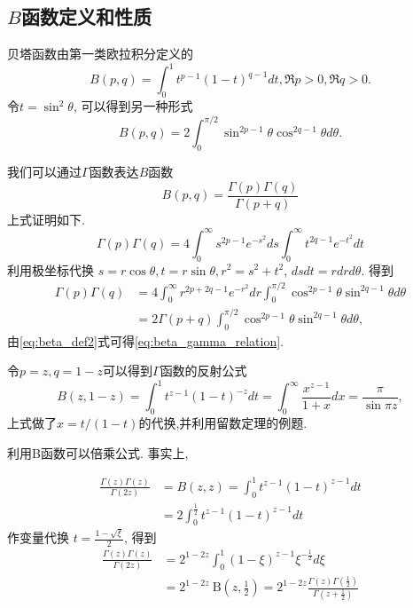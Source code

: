 \subsection{$B$函数定义和性质}
贝塔函数由第一类欧拉积分定义的
\begin{equation}
    B(p, q) = \int_0^1 t^{p -1} (1-t)^{q-1} dt, \Re p> 0, \Re q >0.
    \label{eq:beta_def1}
\end{equation}
令$t=\sin^2{\theta}$, 可以得到另一种形式
\begin{equation}
    B(p, q)  = 2\int_{0}^{\pi/2} \sin ^{2p -1}{\theta} \cos^{2q -1}{\theta} d\theta.
    \label{eq:beta_def2}
\end{equation}

我们可以通过$\Gamma$函数表达$B$函数
\begin{equation}
B(p, q)=\frac{\Gamma(p) \Gamma(q)}{\Gamma(p+q)}
\label{eq:beta_gamma_relation}
\end{equation}
上式证明如下.
$$
\Gamma(p) \Gamma(q)=4 \int_{0}^{\infty} s^{2 p-1} e^{-s^{2}} d s \int_{0}^{\infty} t^{2 q-1} e^{-t^{2}} d t
$$
利用极坐标代换
 $s=r \cos \theta, t=r \sin \theta, r^{2}=s^{2}+t^{2}$,  $d s d t=r d r d \theta$.
 得到
 $$
 \begin{aligned}
 \Gamma(p) \Gamma(q) & =4 \int_{0}^{\infty} r^{2 p+2 q-1} e^{-r^{2}} d r \int_{0}^{\pi / 2} \cos ^{2 p-1} \theta \sin ^{2 q-1} \theta d \theta \\
 & =2 \Gamma(p+q) \int_{0}^{\pi / 2} \cos ^{2 p-1} \theta \sin ^{2 q-1} \theta d \theta,
 \end{aligned}
 $$
 由\ref{eq:beta_def2}式可得\ref{eq:beta_gamma_relation}.

令$p=z, q=1-z$可以得到$\Gamma$函数的反射公式
\begin{equation}
    B(z, 1-z) = \int_0^{1} t^{z-1} (1-t)^{-z} dt 
     = \int_0^{\infty} \frac{x^{z-1}}{1+x} dx
     = \frac{\pi}{\sin{\pi z} }, 
\end{equation}
上式做了$x = t/(1-t)$的代换,并利用留数定理的例题.


利用B函数可以倍乘公式. 事实上,

\begin{equation}
\begin{aligned}
\frac{\Gamma(z) \Gamma(z)}{\Gamma(2 z)} & =B(z, z)=\int_{0}^{1} t^{z-1}(1-t)^{z-1} d t \\
& =2 \int_{0}^{\frac{1}{2}} t^{z-1}(1-t)^{z-1} d t
\end{aligned}
\end{equation}
作变量代换 $t=\frac{1-\sqrt{\xi}}{2}$, 得到
$$
\begin{aligned}
\frac{\Gamma(z) \Gamma(z)}{\Gamma(2 z)} & =2^{1-2 z} \int_{0}^{1}(1-\xi)^{z-1} \xi^{-\frac{1}{2}} d \xi \\
& =2^{1-2 z} \mathrm{~B}\left(z, \frac{1}{2}\right)=2^{1-2 z} \frac{\Gamma(z) \Gamma\left(\frac{1}{2}\right)}{\Gamma\left(z+\frac{1}{2}\right)}
\end{aligned}
$$
